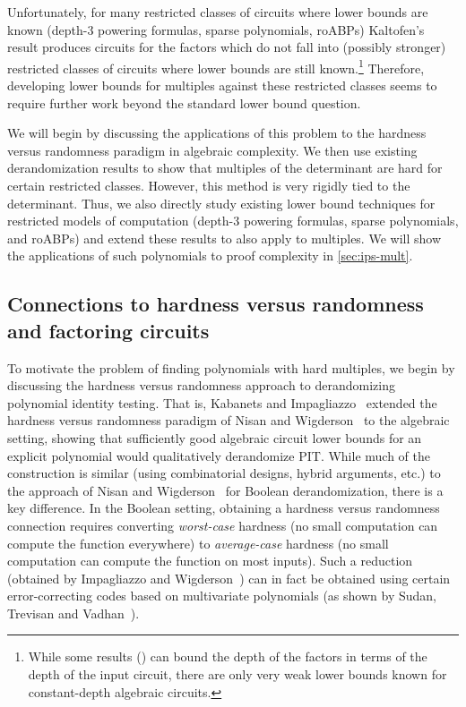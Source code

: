 \documentclass{toc}
\begin{document}
Unfortunately, for many restricted classes of circuits where lower bounds are known (depth-3 powering formulas, sparse polynomials, roABPs) Kaltofen's~\cite{Kaltofen89} result produces circuits for the factors which do not fall into (possibly stronger) restricted classes of circuits where lower bounds are still known.\footnote{While some results (\cite{DvirSY09,Oliveira15}) can bound the depth of the factors in terms of the depth of the input circuit, there are only very weak lower bounds known for constant-depth algebraic circuits.}
Therefore, %
developing lower bounds for multiples against these restricted classes seems to require further work beyond the standard lower bound question.

We will begin by discussing the applications of this problem to the hardness versus randomness paradigm in algebraic complexity.  We then use existing derandomization results to show that multiples of the determinant are hard for certain restricted classes. However, this method is very rigidly tied to the determinant.  Thus, we also directly study existing lower bound techniques for restricted models of computation (depth-$3$ powering formulas, sparse polynomials, and roABPs) and extend these results to also apply to multiples.  We will show the applications of such polynomials to proof complexity in \autoref{sec:ips-mult}.

\subsection{Connections to hardness versus randomness and factoring circuits}\label{sec:lbs-mult:hard-v-rand}

To motivate the problem of finding polynomials with hard multiples, we begin by discussing the hardness versus randomness approach to derandomizing polynomial identity testing.  That is, Kabanets and Impagliazzo~\cite{KabanetsImpagliazzo04} extended the hardness versus randomness paradigm of Nisan and Wigderson~\cite{NisanWigderson94} to the algebraic setting, showing that sufficiently good algebraic circuit lower bounds for an explicit polynomial would qualitatively derandomize PIT\@.  While much of the construction is similar (using combinatorial designs, hybrid arguments, etc.) to the approach of Nisan and Wigderson~\cite{NisanWigderson94} for Boolean derandomization, there is a key difference.  In the Boolean setting, obtaining a hardness versus randomness connection requires converting \emph{worst-case} hardness (no small computation can compute the function everywhere) to \emph{average-case} hardness (no small computation can compute the function on most inputs).  Such a reduction (obtained by Impagliazzo and Wigderson~\cite{ImpagliazzoWigderson97}) can in fact be obtained using certain error-correcting codes based on multivariate polynomials (as shown by Sudan, Trevisan and Vadhan~\cite{SudanTV01}).
\end{document}
